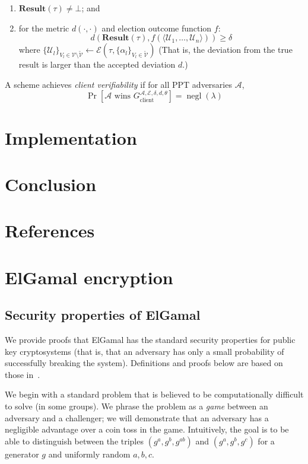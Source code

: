 \documentclass[12pt,a4paper]{article}
\DeclareMathOperator{\negl}{\text{negl}}
\theoremstyle{definition}
\begin{document}
\begin{definition}
\begin{enumerate}
        \item $\mathbf{Result}(\tau) \neq \bot$; and
        \item for the metric $d(\cdot, \cdot)$ and election outcome function $f$:
                    $$d(\mathbf{Result}(\tau), f(\langle\mathcal{U}_1,\ldots,\mathcal{U}_n\rangle)) \geq \delta$$
            where $\{\mathcal{U}_l\}_{V_l \in \mathcal{V} \setminus \tilde{\mathcal{V}}} \leftarrow \mathcal{E}(\tau, \{\alpha_l \}_{V_l \in \tilde{\mathcal{V}}})$
            (That is, the deviation from the true result is larger than the accepted deviation $d$.)
    \end{enumerate}
    A scheme achieves \textit{client verifiability} if for all PPT adversaries $\mathcal{A}$, $$\Pr\left[\mathcal{A}\text{ wins }G_\text{client}^{\mathcal{A},\mathcal{E},\delta,d,\theta}\right]=\negl(\lambda)$$
\end{definition}
\section{Implementation}\label{sec-impl}
\section{Conclusion}
\newpage
\section{References}


\newpage
\appendix
\section{ElGamal encryption}\label{app-elgamal}
\subsection{Security properties of ElGamal}
We provide proofs that ElGamal has the standard security properties for public key cryptosystems (that is, that an adversary has only a small probability of successfully breaking the system). Definitions and proofs below are based on those in~\cite{katz2014introduction}.

We begin with a standard problem that is believed to be computationally difficult to solve (in some groups). We phrase the problem as a \textit{game} between an adversary and a challenger; we will demonstrate that an adversary has a negligible advantage over a coin toss in the game. Intuitively, the goal is to be able to distinguish between the triples $(g^a, g^b, g^{ab})$ and $(g^a, g^b, g^c)$ for  a generator $g$ and uniformly random $a, b, c$.
\end{document}
